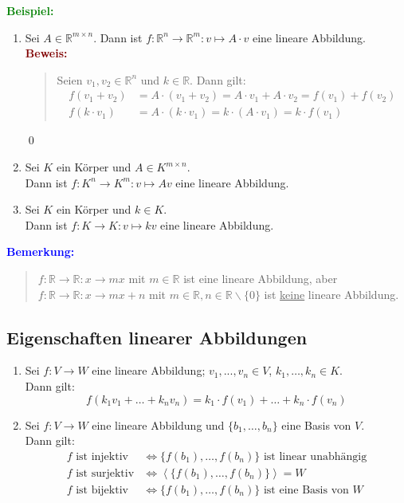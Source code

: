 \documentclass{article}
\newcommand{\blue}[1]{\textcolor{blue}{#1}}
\newcommand{\green}[1]{\textcolor{green}{#1}}
\newcommand{\maroon}[1]{\textcolor{maroon}{#1}}
\newcommand{\ex}{\green{\textbf{Beispiel: }}}
\newcommand{\an}[1]{\blue{\textbf{Bemerkung: }}\begin{quote}#1\end{quote}}
\newcommand{\pr}[1]{\maroon{\textbf{Beweis: }}\begin{quote}#1\end{quote}\qed}
\newcommand{\R}{\mathbb{R}}
\newcommand{\spann}[1]{\left\langle#1\right\rangle}
\begin{document}
\ex \begin{enumerate}
    \item Sei $A \in \R^{m \times n}$. Dann ist $f: \R^n \to \R^m: v \mapsto A \cdot v$ eine lineare Abbildung.
    \pr{
        Seien $v_1,v_2 \in \R^n$ und $k \in \R$. Dann gilt:
        \begin{align*}
            f(v_1 + v_2) &= A \cdot (v_1 + v_2) = A \cdot v_1 + A \cdot v_2 = f(v_1) + f(v_2)\\
            f(k \cdot v_1) &= A \cdot (k \cdot v_1) = k \cdot (A \cdot v_1) = k \cdot f(v_1)
        \end{align*}
    }
    \item Sei $K$ ein Körper und $A \in K^{m \times n}$.\\
    Dann ist $f: K^n \to K^m: v \mapsto Av$ eine lineare Abbildung.
    \item Sei $K$ ein Körper und $k \in K$.\\
    Dann ist $f: K \to K: v \mapsto kv$ eine lineare Abbildung.
\end{enumerate}

\an{
    $f: \R \to \R: x \to mx$ mit $m \in \R$ ist eine lineare Abbildung, aber\\
    $f: \R \to \R: x \to mx + n$ mit $m \in \R, n \in \R \backslash \{0\}$ ist \underline{keine} lineare Abbildung. 
}

\subsection{Eigenschaften linearer Abbildungen}

\begin{enumerate}
    \item Sei $f: V \to W$ eine lineare Abbildung; $v_1, ..., v_n \in V$, $k_1, \dots, k_n \in K$.\\
    Dann gilt:
    $$f(k_1v_1 + \dots + k_nv_n) = k_1 \cdot f(v_1) + \dots + k_n \cdot f(v_n)$$
    \item Sei $f: V \to W$ eine lineare Abbildung und $\{b_1,\dots,b_n\}$ eine Basis von $V$.\\
    Dann gilt:
    \begin{align*}
        f \text{ ist injektiv} &\iff \{f(b_1),\dots,f(b_n)\} \text{ ist linear unabhängig}\\
        f \text{ ist surjektiv} &\iff \spann{\{f(b_1),\dots,f(b_n)\}} = W\\
        f \text{ ist bijektiv} &\iff \{f(b_1),\dots,f(b_n)\} \text{ ist eine Basis von } W
    \end{align*}
\end{enumerate}
\end{document}

